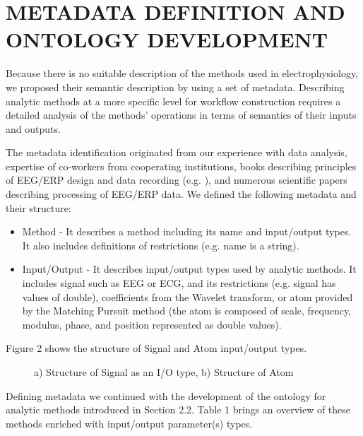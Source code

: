 \documentclass[a4paper,twoside]{article}
\begin{document}
\section{\uppercase{Metadata Definition and Ontology Development}}

\noindent Because there is no suitable description of the methods used in electrophysiology, we proposed their semantic description by using a set of metadata. Describing analytic methods at a more specific level for workflow construction requires a detailed analysis of the methods' operations in terms of semantics of their inputs and outputs.

The metadata identification originated from our experience with data analysis, expertise of co-workers from cooperating institutions, books describing principles of EEG/ERP design and data recording (e.g. \cite{Luck05}), and numerous scientific papers describing processing of EEG/ERP data. We defined the following metadata and their structure:
\begin{itemize}
	\item Method - It describes a method including its name and input/output types. It also includes definitions of restrictions (e.g. name is a string).
	
	\item Input/Output - It describes input/output types used by analytic methods. It includes signal such as EEG or ECG, and its restrictions (e.g. signal has values of double), coefficients from the Wavelet transform, or atom provided by the Matching Pursuit method (the atom is composed of scale, frequency, modulus, phase, and position represented as double values).
	
\end{itemize}

Figure 2 shows the structure of Signal and Atom input/output types.

\begin{figure}[!h]

  \centering
   {}
  \caption{a) Structure of Signal as an I/O type, b) Structure of Atom }
  \label{fig:SignalAndAtom}
 \end{figure}

Defining metadata we continued with the development of the ontology for analytic methods introduced in Section 2.2. Table 1 brings an overview of these methods enriched with input/output parameter(s) types.
\end{document}
